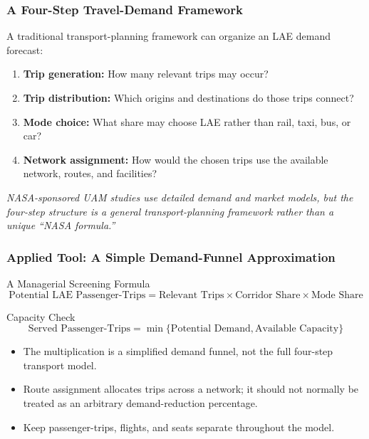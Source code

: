 \documentclass{beamer}
\begin{document}
\begin{frame}[t]
\frametitle{A Four-Step Travel-Demand Framework}
A traditional transport-planning framework can organize an LAE demand forecast:
\begin{enumerate}
\item \textbf{Trip generation:} How many relevant trips may occur?
\item \textbf{Trip distribution:} Which origins and destinations do those trips connect?
\item \textbf{Mode choice:} What share may choose LAE rather than rail, taxi, bus, or car?
\item \textbf{Network assignment:} How would the chosen trips use the available network, routes, and facilities?
\end{enumerate}
\textit{NASA-sponsored UAM studies use detailed demand and market models, but the four-step structure is a general transport-planning framework rather than a unique ``NASA formula.''}
\end{frame}


\begin{frame}[t]
\frametitle{Applied Tool: A Simple Demand-Funnel Approximation}
\begin{block}{A Managerial Screening Formula}
\[
\text{Potential LAE Passenger-Trips}
=\text{Relevant Trips}\times\text{Corridor Share}\times\text{Mode Share}
\]
\end{block}
\begin{block}{Capacity Check}
\[
\text{Served Passenger-Trips}
=\min\{\text{Potential Demand},\text{Available Capacity}\}
\]
\end{block}
\begin{itemize}
\item The multiplication is a simplified demand funnel, not the full four-step transport model.
\item Route assignment allocates trips across a network; it should not normally be treated as an arbitrary demand-reduction percentage.
\item Keep passenger-trips, flights, and seats separate throughout the model.
\end{itemize}
\end{frame}
\end{document}
